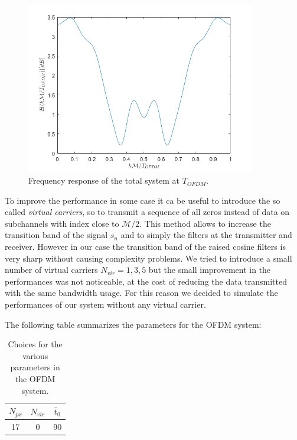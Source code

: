\documentclass[a4paper,11.5pt]{article}
\begin{document}
\begin{figure}[H]
	\begin{center}   
		\includegraphics[width=10cm]{figs/H_mag.png} 
		\caption{Frequency response of the total system at $T_{OFDM}$.}
		\label{fig:H}
	\end{center}
\end{figure}


To improve the performance in some case it ca be useful to introduce the so called \emph{virtual carriers}, so to transmit a sequence of all zeros instead of data on subchannels with index close to $\mathcal{M}/2$. This method allows to increase the transition band of the signal $s_n$ and to simply the filters at the transmitter and receiver. However in our case the transition band of the raised cosine filters is very sharp without causing complexity problems. We tried to introduce a small number of virtual carriers $N_{vir} = 1,3,5$ but the small improvement in the performances was not noticeable, at the cost of reducing the data transmitted with the same bandwidth usage. For this reason we decided to simulate the performances of our system without any virtual carrier.

The following table summarizes the parameters for the OFDM system:

\begin{table}[htbp]
	\begin{center}
		\begin{tabular}{ccc}
			\toprule
			$N_{px}$ & $N_{vir}$ &$\bar{t}_0$ \\
			\midrule
			17 & 0 &90 \\
			\bottomrule
		\end{tabular}
	\end{center}
	\label{tab:sumup2}
	\caption{Choices for the various parameters in the OFDM system.}
\end{table} 
\end{document}
